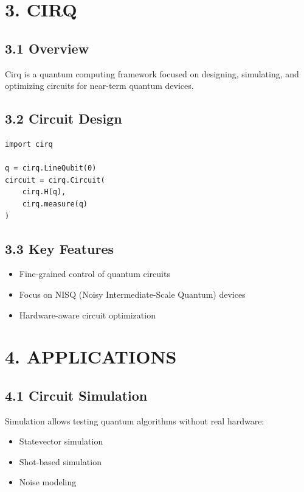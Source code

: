 \vspace{0.5cm}

\section*{3. CIRQ}

\subsection*{3.1 Overview}

Cirq is a quantum computing framework focused on designing, simulating, and optimizing circuits for near-term quantum devices.

\subsection*{3.2 Circuit Design}

\begin{verbatim}
import cirq

q = cirq.LineQubit(0)
circuit = cirq.Circuit(
    cirq.H(q),
    cirq.measure(q)
)
\end{verbatim}

\subsection*{3.3 Key Features}

\begin{itemize}
\item Fine-grained control of quantum circuits
\item Focus on NISQ (Noisy Intermediate-Scale Quantum) devices
\item Hardware-aware circuit optimization
\end{itemize}

\vspace{0.5cm}

\section*{4. APPLICATIONS}

\subsection*{4.1 Circuit Simulation}

Simulation allows testing quantum algorithms without real hardware:

\begin{itemize}
\item Statevector simulation
\item Shot-based simulation
\item Noise modeling
\end{itemize}

